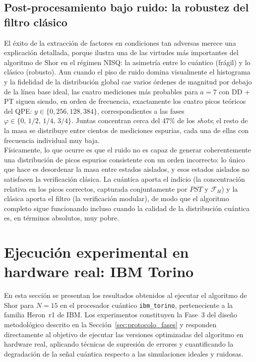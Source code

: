 \documentclass[12pt, spanish]{book}
\begin{document}
\subsection{Post-procesamiento bajo ruido: la robustez del filtro clásico}
\label{subsec:fracciones_ruido}

El éxito de la extracción de factores en condiciones tan adversas merece una explicación detallada, porque ilustra una de las virtudes más importantes del algoritmo de Shor en el régimen NISQ: la asimetría entre lo cuántico (frágil) y lo clásico (robusto). Aun cuando el piso de ruido domina visualmente el histograma y la fidelidad de la distribución global cae varios órdenes de magnitud por debajo de la línea base ideal, las cuatro mediciones más probables para $a = 7$ con DD + PT siguen siendo, en orden de frecuencia, exactamente los cuatro picos teóricos del QPE: $y \in \{0, 256, 128, 384\}$, correspondientes a las fases $\varphi \in \{0,\, 1/2,\, 1/4,\, 3/4\}$. Juntas concentran cerca del 47\% de los \textit{shots}; el resto de la masa se distribuye entre cientos de mediciones espurias, cada una de ellas con frecuencia individual muy baja.\\

Físicamente, lo que ocurre es que el ruido no es capaz de generar coherentemente una distribución de picos espurios consistente con un orden incorrecto: lo único que hace es desordenar la masa entre estados aislados, y esos estados aislados no satisfacen la verificación clásica. La cuántica aporta el indicio (la concentración relativa en los picos correctos, capturada conjuntamente por $PST$ y $\mathcal{F}_H$) y la clásica aporta el filtro (la verificación modular), de modo que el algoritmo completo sigue funcionando incluso cuando la calidad de la distribución cuántica es, en términos absolutos, muy pobre.


\section{Ejecución experimental en hardware real: IBM Torino}
\label{sec:resultados_hardware}

En esta sección se presentan los resultados obtenidos al ejecutar el algoritmo de Shor para $N = 15$ en el procesador cuántico \texttt{ibm\_torino}, perteneciente a la familia Heron~r1 de IBM. Los experimentos constituyen la Fase~3 del diseño metodológico descrito en la Sección~\ref{sec:protocolo_fases} y responden directamente al objetivo de ejecutar las versiones optimizadas del algoritmo en hardware real, aplicando técnicas de supresión de errores y cuantificando la degradación de la señal cuántica respecto a las simulaciones ideales y ruidosas.
\end{document}
